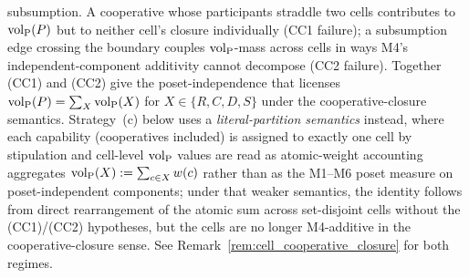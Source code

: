 \begin{definition}
subsumption.  A cooperative
whose participants straddle two cells contributes to ${\operatorname{vol}_{\mathrm{P}}}(P)$
but to neither cell's closure individually (CC1 failure); a
subsumption edge crossing the boundary couples ${\operatorname{vol}_{\mathrm{P}}}$-mass
across cells in ways M4's independent-component additivity
cannot decompose (CC2 failure).  Together (CC1) and (CC2) give
the poset-independence that licenses ${\operatorname{vol}_{\mathrm{P}}}(P) = \sum_X
{\operatorname{vol}_{\mathrm{P}}}(X)$ for $X \in \{R, C, D, S\}$ under the
cooperative-closure semantics.  Strategy~(c) below uses a
\emph{literal-partition semantics} instead, where each
capability (cooperatives included) is assigned to exactly one
cell by stipulation and cell-level ${\operatorname{vol}_{\mathrm{P}}}$ values are read as
atomic-weight accounting aggregates
${\operatorname{vol}_{\mathrm{P}}}(X) := \sum_{c \in X} w(c)$ rather than as the M1--M6
poset measure on poset-independent components; under that
weaker semantics, the identity follows from direct rearrangement
of the atomic sum across set-disjoint cells without the
(CC1)/(CC2) hypotheses, but the cells are no
longer M4-additive in the cooperative-closure sense.  See
Remark~\ref{rem:cell_cooperative_closure} for both regimes.


\end{definition}
